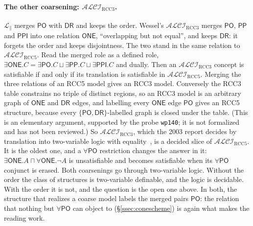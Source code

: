 \documentclass[11pt]{article}
\newcommand{\ALCIRCC}[1]{\mathcal{ALCI}_{\mathrm{RCC#1}}}
\newcommand{\DR}{\mathsf{DR}}
\newcommand{\PO}{\mathsf{PO}}
\newcommand{\PP}{\mathsf{PP}}
\newcommand{\PPI}{\mathsf{PPI}}
\theoremstyle{plain}
\theoremstyle{definition}
\begin{document}
\paragraph{The other coarsening: $\ALCIRCC3$.} $\mathcal L_{\parallel}$ merges
$\PO$ with $\DR$ and keeps the order. Wessel's $\ALCIRCC3$ merges $\PO$, $\PP$
and $\PPI$ into one relation $\mathsf{ONE}$, ``overlapping but not equal'', and
keeps $\DR$: it forgets the order and keeps disjointness. The two stand in the
same relation to $\ALCIRCC5$. Read the merged role as a defined role,
$\exists\mathsf{ONE}.C=\exists\PO.C\sqcup\exists\PP.C\sqcup\exists\PPI.C$ and
dually. Then an $\ALCIRCC3$ concept is satisfiable if and only if its
translation is satisfiable in $\ALCIRCC5$. Merging the three relations of an
RCC5 model gives an RCC3 model. Conversely the RCC3 table constrains no triple
of distinct regions, so an RCC3 model is an arbitrary graph of $\mathsf{ONE}$
and $\DR$ edges, and labelling every $\mathsf{ONE}$ edge $\PO$ gives an RCC5
structure, because every $\{\PO,\DR\}$-labelled graph is closed under the
table. (This is an elementary argument, supported by the probe
\texttt{wp140}; it is not formalized and has not been reviewed.) So
$\ALCIRCC3$, which the 2003 report decides by translation into two-variable
logic with equality~\cite[\S4.3]{Wessel2003}, is a decided slice of
$\ALCIRCC5$. It is the oldest one, and a $\forall\PO$ restriction changes the
answer in it: $\exists\mathsf{ONE}.A\sqcap\forall\mathsf{ONE}.\neg A$ is
unsatisfiable and becomes satisfiable when its $\forall\PO$ conjunct is erased.
Both coarsenings go through two-variable logic. Without the order the class of
structures is two-variable definable, and the logic is decidable. With the
order it is not, and the question is the open one above. In both, the
structure that realizes a coarse model labels the merged pairs $\PO$: the
relation that nothing but $\forall\PO$ can object to
(\S\ref{ssec:conescheme}) is again what makes the reading work.
\end{document}
